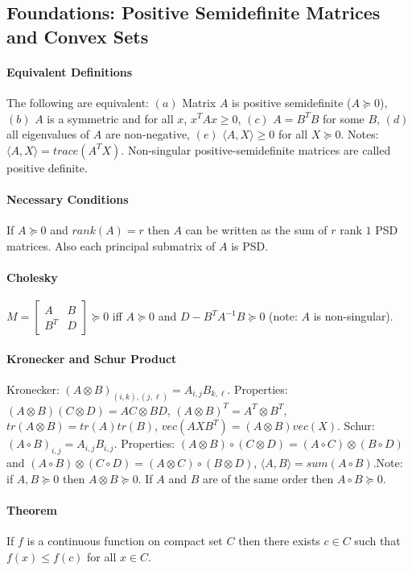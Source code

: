 \documentclass[letterpaper,11pt,oneside,onecolumn]{article}
\begin{document}
\subsection*{Foundations: Positive Semidefinite Matrices and Convex Sets}
\paragraph{Equivalent Definitions} The following are equivalent: $(a)$ Matrix $A$ is positive semidefinite ($A\succcurlyeq 0$), $(b)$ $A$ is a symmetric and for all $x$, $x^TAx \geq 0$, $(c)$ $A = B^TB$ for some $B$, $(d)$ all eigenvalues of $A$ are non-negative, $(e)$ $\langle A, X\rangle \geq
 0$ for all $X \succcurlyeq 0$. Notes: $\langle A, X\rangle = trace(A^TX)$. Non-singular positive-semidefinite matrices are called positive definite.
 \paragraph{Necessary Conditions}
 If $A \succcurlyeq 0$ and $rank(A) = r$ then $A$ can be written as the sum of $r$ rank $1$ PSD matrices. Also each principal submatrix of $A$ is PSD.
 \paragraph{Cholesky} $M = \begin{bmatrix} A & B \\  B^T &D\end{bmatrix} \succcurlyeq 0$ iff $A \succcurlyeq 0$ and $D - B^TA^{-1}B \succcurlyeq 0$ (note: $A$ is non-singular).
\paragraph{Kronecker and Schur Product}Kronecker: $(A \otimes B)_{(i,k),(j,\ell)} = A_{i,j}B_{k,\ell}$. Properties: $(A\otimes B)(C\otimes D) = AC \otimes BD$, $(A\otimes B)^T = A^T \otimes B^T$, $tr(A \otimes B)= tr(A) tr(B)$, $vec(AXB^T) = (A\otimes B)vec(X)$. Schur: $(A \circ B)_{i,j} = A_{i,j}B_{i,j}$. Properties: $(A\otimes B) \circ(C\otimes D) = (A\circ C) \otimes (B \circ D)$ and $(A \circ B)\otimes(C\circ D) = (A\otimes C) \circ(B \otimes D)$, $\langle A, B \rangle = sum(A \circ B)$.Note: if $A, B\succcurlyeq 0$ then $A\otimes B \succcurlyeq 0$. If $A$ and $B$ are of the same order then $A\circ B \succcurlyeq 0$.
\paragraph{Theorem} If $f$ is a continuous function on compact set $C$ then there exists $c\in C$ such that $f(x) \leq f(c)$ for all $x \in C$.
\end{document}
